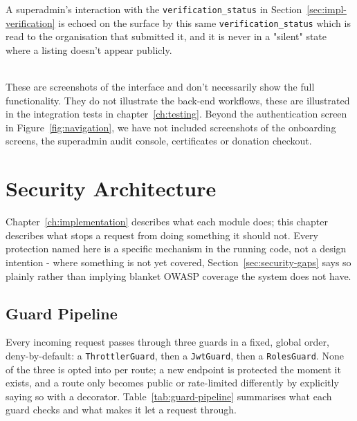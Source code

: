 \noindent A superadmin's interaction with the \texttt{verification\_status} in Section~\ref{sec:impl-verification} is echoed on the surface by this same \texttt{verification\_status} which is read to the organisation that submitted it, and it is never in a "silent" state where a listing doesn't appear publicly.

\noindent  \\ These are screenshots of the interface and don't necessarily show the full functionality. They do not illustrate the back-end workflows, these are illustrated in the integration tests in chapter~\ref{ch:testing}. Beyond the authentication screen in Figure~\ref{fig:navigation}, we have not included screenshots of the onboarding screens, the superadmin audit console, certificates or donation checkout.

\chapter{Security Architecture}
\label{ch:security}
Chapter~\ref{ch:implementation} describes what each module does; this chapter describes what stops a request from doing something it should not. Every protection named here is a specific mechanism in the running code, not a design intention - where something is not yet covered, Section~\ref{sec:security-gaps} says so plainly rather than implying blanket OWASP coverage the system does not have.

\section{Guard Pipeline}
\label{sec:guard-pipeline}
Every incoming request passes through three guards in a fixed, global order, deny-by-default: a \texttt{ThrottlerGuard}, then a \texttt{JwtGuard}, then a \texttt{RolesGuard}. None of the three is opted into per route; a new endpoint is protected the moment it exists, and a route only becomes public or rate-limited differently by explicitly saying so with a decorator. Table~\ref{tab:guard-pipeline} summarises what each guard checks and what makes it let a request through.

